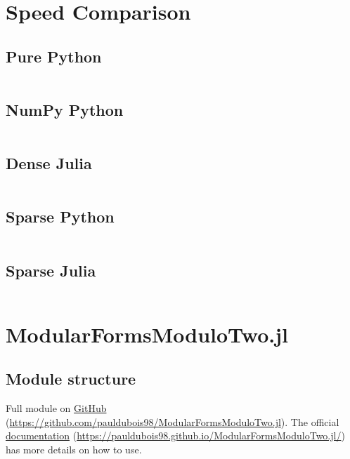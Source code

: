 
\section{Speed Comparison}
\subsection{Pure Python}
\label{code:PurePython}
\inputminted[lastline=19, breaklines]{python}{SpeedComparison/PurePython.py}

\subsection{NumPy Python}
\label{code:NumPyPython}
\inputminted[lastline=21, breaklines]{python}{SpeedComparison/NumPyPython.py}

\subsection{Dense Julia}
\label{code:DenseJulia}
\inputminted[lastline=24, breaklines]{julia}{SpeedComparison/DenseJulia.jl}

\subsection{Sparse Python}
\label{code:SparsePython}
\inputminted[lastline=18, breaklines]{python}{SpeedComparison/SparsePython.py}

\subsection{Sparse Julia}
\label{code:SparseJulia}
\inputminted[lastline=24, breaklines]{julia}{SpeedComparison/SparseJulia.jl}





\section{ModularFormsModuloTwo.jl}
\subsection[Files Tree]{Module structure}
Full module on \href{https://github.com/pauldubois98/ModularFormsModuloTwo.jl}{GitHub} (\url{https://github.com/pauldubois98/ModularFormsModuloTwo.jl}).
The official \href{https://pauldubois98.github.io/ModularFormsModuloTwo.jl/}{documentation} (\url{https://pauldubois98.github.io/ModularFormsModuloTwo.jl/}) has more details on how to use.

